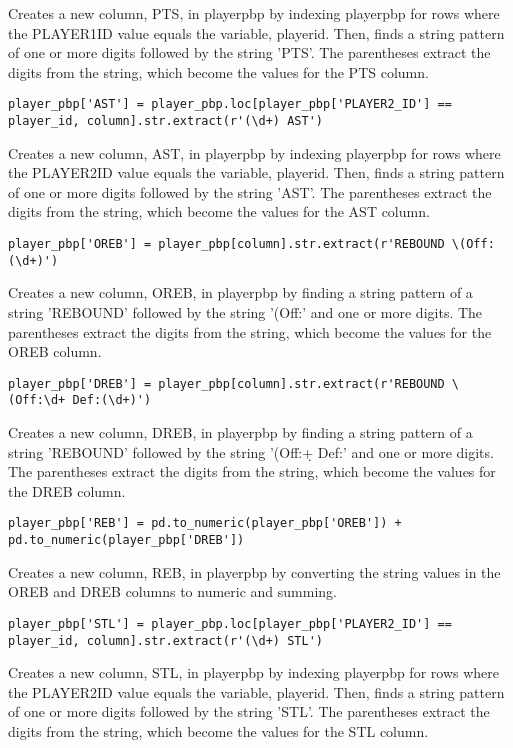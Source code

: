 \documentclass{article}
\begin{document}
Creates a new column, PTS, in player\textunderscore pbp by indexing player\textunderscore pbp for rows where the PLAYER1\textunderscore ID value equals the variable, player\textunderscore id. Then, finds a string pattern of one or more digits followed by the string 'PTS'. The parentheses extract the digits from the string, which become the values for the PTS column.
\begin{lstlisting}
player_pbp['AST'] = player_pbp.loc[player_pbp['PLAYER2_ID'] == player_id, column].str.extract(r'(\d+) AST')
\end{lstlisting}
Creates a new column, AST, in player\textunderscore pbp by indexing player\textunderscore pbp for rows where the PLAYER2\textunderscore ID value equals the variable, player\textunderscore id. Then, finds a string pattern of one or more digits followed by the string 'AST'. The parentheses extract the digits from the string, which become the values for the AST column.
\begin{lstlisting}
player_pbp['OREB'] = player_pbp[column].str.extract(r'REBOUND \(Off:(\d+)')
\end{lstlisting}
Creates a new column, OREB, in player\textunderscore pbp by finding a string pattern of a string 'REBOUND' followed by the string '(Off:' and one or more digits. The parentheses extract the digits from the string, which become the values for the OREB column.
\begin{lstlisting}
player_pbp['DREB'] = player_pbp[column].str.extract(r'REBOUND \(Off:\d+ Def:(\d+)')
\end{lstlisting}
Creates a new column, DREB, in player\textunderscore pbp by finding a string pattern of a string 'REBOUND' followed by the string '(Off:\d+ Def:' and one or more digits. The parentheses extract the digits from the string, which become the values for the DREB column.
\begin{lstlisting}
player_pbp['REB'] = pd.to_numeric(player_pbp['OREB']) + pd.to_numeric(player_pbp['DREB'])
\end{lstlisting}
Creates a new column, REB, in player\textunderscore pbp by converting the string values in the OREB and DREB columns to numeric and summing.
\begin{lstlisting}
player_pbp['STL'] = player_pbp.loc[player_pbp['PLAYER2_ID'] == player_id, column].str.extract(r'(\d+) STL')
\end{lstlisting}
Creates a new column, STL, in player\textunderscore pbp by indexing player\textunderscore pbp for rows where the PLAYER2\textunderscore ID value equals the variable, player\textunderscore id. Then, finds a string pattern of one or more digits followed by the string 'STL'. The parentheses extract the digits from the string, which become the values for the STL column.
\end{document}
